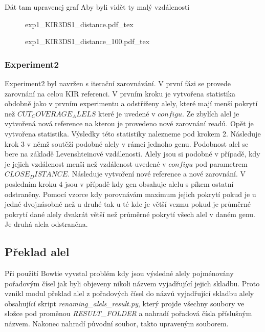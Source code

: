 \documentclass[czech,DP]{thesiskiv}
\numberwithin{equation}{section}
\begin{document}
Dát tam upravenej graf Aby byli vidět ty malý vzdálenosti
\begin{figure}[H]
	\centering
    \def\svgwidth{\columnwidth}
    {exp1_KIR3DS1_distance.pdf_tex} 
\end{figure}

\begin{figure}[H]
	\centering
    \def\svgwidth{\columnwidth}
    {exp1_KIR3DS1_distance_100.pdf_tex} 
\end{figure}
 
 

\subsubsection{Experiment2}
Experiment2 byl navržen s iterační zarovnávání. V první fázi se provede zarovnání na celou KIR referenci. V prvním kroku je vytvořena statistika obdobně jako v prvním experimentu a odstřiženy alely, které mají menší pokrytí než $CUT_COVERAGE_ALELS$ které je uvedené v $configu$. Ze zbylích alel je vytvořená nová reference na kterou je provedeno nové zarovnání readů. Opět je vytvořena statistika. Výsledky této statistiky nalezneme pod krokem 2. Následuje krok 3 v němž soutěží podobné alely v rámci jednoho genu. Podobnost alel se bere na základě Levenshteinové vzdálenosti. Alely jsou si podobné v případě, kdy je jejich vzdálenost menši než vzdálenost uvedené v $configu$ pod parametrem $CLOSE_DISTANCE$. Následuje vytvoření nové reference a nové zarovnání. V posledním kroku 4 jsou v případě kdy gen obsahuje alelu s píkem ostatní odstraněny. Pomocí vzorce kdy porovnávám maximum jejich pokrytí pokud je u jedné dvojnásobné než u druhé tak u té kde je větší vezmu pokud je  průměrné pokrytí dané alely dvakrát větší než průměrné pokrytí všech alel v daném genu. Je druhá alela odstraněna.


\subsection{Překlad alel}
Při použití Bowtie vyvstal problém kdy jsou výsledné alely pojménovány pořadovým čísel jak byli objeveny nikoli názvem vyjadřující jejich skladbu. Proto vznikl modul překlad alel z pořadových čísel do názvů vyjadřující skladbu alely obsahující skript \textit{renaming\_alels\_result.py}, který projde všechny soubory ve složce pod proměnou \textit{RESULT\_FOLDER} a nahradí pořadová čísla příslušným názvem. Nakonec nahradí původní soubor, takto upraveným souborem.
\end{document}
